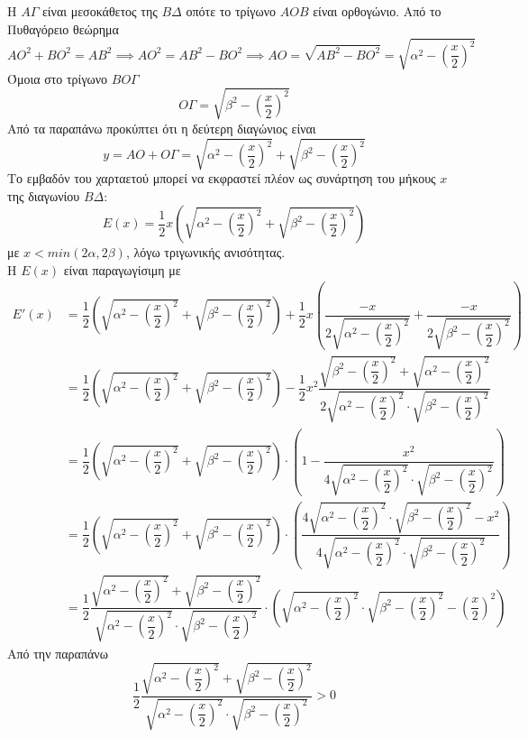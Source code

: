\documentclass[11pt]{article}
\begin{document}
H $AΓ$ είναι μεσοκάθετος της $ΒΔ$ οπότε το τρίγωνο $ΑΟΒ$ είναι ορθογώνιο. Aπό το Πυθαγόρειο θεώρημα \[ΑΟ^2+ΒΟ^2=ΑΒ^2\implies AO^2=AB^2-BO^2\implies AO=\sqrt{AB^2-BO^2}=\sqrt{α^2-\left(\dfrac{x}{2}\right)^2 }\] 
Όμοια στο τρίγωνο $ΒΟΓ$ \[OΓ=\sqrt{β^2-\left(\dfrac{x}{2}\right)^2 }\]
Από τα παραπάνω προκύπτει ότι η δεύτερη διαγώνιος είναι  \[y=AΟ+ΟΓ=\sqrt{α^2-\left(\dfrac{x}{2}\right)^2 }+\sqrt{β^2-\left(\dfrac{x}{2}\right)^2 }\]
Το εμβαδόν του χαρταετού μπορεί να εκφραστεί πλέον ως συνάρτηση του μήκους $x$ της διαγωνίου $ΒΔ$:
\[Ε(x)=\dfrac{1}{2}x\left(
\sqrt{α^2-\left(\dfrac{x}{2}\right)^2 }+\sqrt{β^2-\left(\dfrac{x}{2}\right)^2 }
\right)\]
με $x<min(2α,2β)$, λόγω τριγωνικής ανισότητας.\\
H $E(x)$ είναι παραγωγίσιμη με 
\begin{equation*} 
\begin{split}
Ε'(x) & =\dfrac{1}{2}\left(
\sqrt{α^2-\left(\dfrac{x}{2}\right)^2 }+\sqrt{β^2-\left(\dfrac{x}{2}\right)^2 }
\right)+\dfrac{1}{2}x\left(\dfrac{-x}{2\sqrt{α^2-\left(\dfrac{x}{2}\right)^2 }}+\dfrac{-x}{2\sqrt{β^2-\left(\dfrac{x}{2}\right)^2 }}\right) \\
& = 
\dfrac{1}{2}\left(
\sqrt{α^2-\left(\dfrac{x}{2}\right)^2 }+\sqrt{β^2-\left(\dfrac{x}{2}\right)^2 }
\right)
-\dfrac{1}{2}x^2
\dfrac{\sqrt{β^2-\left(\dfrac{x}{2}\right)^2 }+\sqrt{α^2-\left(\dfrac{x}{2}\right)^2 }}
{2\sqrt{α^2-\left(\dfrac{x}{2}\right)^2 }\cdot\sqrt{β^2-\left(\dfrac{x}{2}\right)^2 }} \\
& =\dfrac{1}{2}\left(
\sqrt{α^2-\left(\dfrac{x}{2}\right)^2 }+\sqrt{β^2-\left(\dfrac{x}{2}\right)^2 }
\right)\cdot
\left(
1-\dfrac{x^2}{4\sqrt{α^2-\left(\dfrac{x}{2}\right)^2}\cdot\sqrt{β^2-\left(\dfrac{x}{2}\right)^2 }}
\right)\\
&=\dfrac{1}{2}\left(
\sqrt{α^2-\left(\dfrac{x}{2}\right)^2 }+\sqrt{β^2-\left(\dfrac{x}{2}\right)^2 }
\right)\cdot
\left(
\dfrac{4\sqrt{α^2-\left(\dfrac{x}{2}\right)^2}\cdot\sqrt{β^2-\left(\dfrac{x}{2}\right)^2 }-x^2}{4\sqrt{α^2-\left(\dfrac{x}{2}\right)^2}\cdot\sqrt{β^2-\left(\dfrac{x}{2}\right)^2 }}
\right)\\
&=\dfrac{1}{2}\dfrac{
\sqrt{α^2-\left(\dfrac{x}{2}\right)^2 }+\sqrt{β^2-\left(\dfrac{x}{2}\right)^2 }
}{\sqrt{α^2-\left(\dfrac{x}{2}\right)^2}\cdot\sqrt{β^2-\left(\dfrac{x}{2}\right)^2 }}\cdot
\left(
\sqrt{α^2-\left(\dfrac{x}{2}\right)^2}\cdot\sqrt{β^2-\left(\dfrac{x}{2}\right)^2 }-\left(\dfrac{x}{2}\right)^2
\right)
\end{split}
\end{equation*}
Από την παραπάνω $$\dfrac{1}{2}\dfrac{
	\sqrt{α^2-\left(\dfrac{x}{2}\right)^2 }+\sqrt{β^2-\left(\dfrac{x}{2}\right)^2 }
}{\sqrt{α^2-\left(\dfrac{x}{2}\right)^2}\cdot\sqrt{β^2-\left(\dfrac{x}{2}\right)^2 }}>0$$
\end{document}
